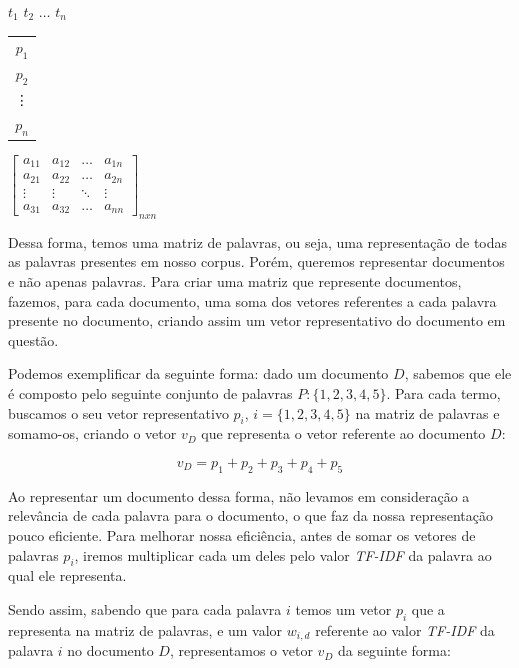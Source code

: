 \documentclass[a4paper,12pt]{article}
\begin{document}
 \begin{center}
 \hspace{0.2cm}$t_{1}$ \hspace{0.5cm} $t_{2}$ \hspace{0.3cm} $\hdots$ \hspace{0.4cm}$t_{n}$
 
 \vspace{0.2cm}
 
\begin{tabular}{c}
   $p_{1}$ \\
   $p_{2}$ \\
   \vdots\\
   $p_{n}$
 \end{tabular}
 $
 \begin{bmatrix}
  a_{11} & a_{12} & \hdots & a_{1n}\\
  a_{21} & a_{22} & \hdots & a_{2n}\\
  \vdots & \vdots & \ddots & \vdots\\
  a_{31} & a_{32} & \hdots & a_{nn}
 \end{bmatrix}_{nxn}
$

\end{center}

Dessa forma, temos uma matriz de palavras, ou seja, uma representação de todas as palavras presentes em nosso corpus.
Porém, queremos representar documentos e não apenas palavras.
Para criar uma matriz que represente documentos, fazemos, para cada documento, uma soma dos vetores referentes a cada palavra presente
no documento, criando assim um vetor representativo do documento em questão.

Podemos exemplificar da seguinte forma: dado um documento $D$, sabemos que ele é composto pelo seguinte conjunto de palavras
$P:\{1,2,3,4,5\}$. Para cada termo, buscamos o seu vetor representativo $p_{i}$, $i =\{1,2,3,4,5\}$ na matriz de
palavras e somamo-os, criando o vetor $v_{D}$ que representa o vetor referente ao documento $D$:

$$v_{D} = p_{1}+p_{2}+p_{3}+p_{4}+p_{5} $$

Ao representar um documento dessa forma, não levamos em consideração a relevância de cada palavra para o documento, o que
faz da nossa representação pouco eficiente. Para melhorar nossa 
eficiência, antes de somar os vetores de palavras $p_{i}$, iremos multiplicar cada um deles pelo valor \textit{TF-IDF} da palavra
ao qual ele representa.

Sendo assim, sabendo que para cada palavra $i$ temos um vetor $p_{i}$ que a representa na matriz de palavras, e um valor $w_{i,d}$ referente
ao valor \textit{TF-IDF} da palavra $i$ no documento $D$, representamos o vetor $v_{D}$ da seguinte forma:
\end{document}
